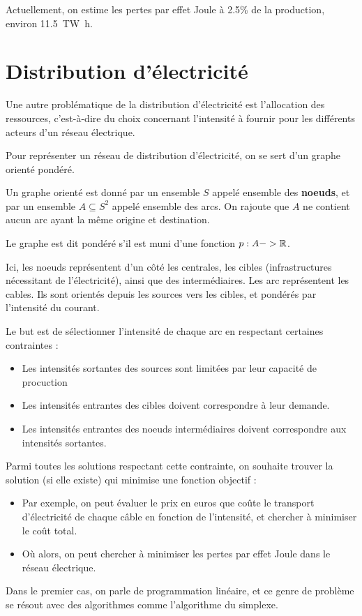 \documentclass{poly}
\begin{document}
Actuellement, on estime les pertes par effet Joule à \num{2,5}\% de la production, environ \qty{11,5}{\tera\watt\hour}.

\section{Distribution d'électricité}
Une autre problématique de la distribution d'électricité est l'allocation des ressources, c'est-à-dire du choix concernant l'intensité à fournir pour les différents acteurs d'un réseau électrique.

Pour représenter un réseau de distribution d'électricité, on se sert d'un graphe orienté pondéré.

\begin{definition}
Un graphe orienté est donné par un ensemble $S$ appelé ensemble des \textbf{noeuds}, et par un ensemble $A \subseteq S^2$ appelé ensemble des arcs. On rajoute que $A$ ne contient aucun arc ayant la même origine et destination.

Le graphe est dit pondéré s'il est muni d'une fonction $p : A -> \mathbb{R}$.
\end{definition}
\begin{example}
\dotfill
\end{example}
Ici, les noeuds représentent d'un côté les centrales, les cibles (infrastructures nécessitant de l'électricité), ainsi que des intermédiaires. Les arc représentent les cables. Ils sont orientés depuis les sources vers les cibles, et pondérés par l'intensité du courant.

Le but est de sélectionner l'intensité de chaque arc en respectant certaines contraintes :
\begin{itemize}
\item Les intensités sortantes des sources sont limitées par leur capacité de procuction
\item Les intensités entrantes des cibles doivent correspondre à leur demande.
\item Les intensités entrantes des noeuds intermédiaires doivent correspondre aux intensités sortantes.
\end{itemize}

Parmi toutes les solutions respectant cette contrainte, on souhaite trouver la solution (si elle existe) qui minimise une fonction objectif :
\begin{itemize}
\item Par exemple, on peut évaluer le prix en euros que coûte le transport d'électricité de chaque câble en fonction de l'intensité, et chercher à minimiser le coût total.
\item Où alors, on peut chercher à minimiser les pertes par effet Joule dans le réseau électrique.  
\end{itemize}
Dans le premier cas, on parle de programmation linéaire, et ce genre de problème se résout avec des algorithmes comme l'algorithme du simplexe.
\end{document}
